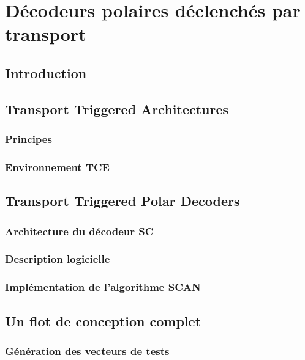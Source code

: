 \chapter{Décodeurs polaires déclenchés par transport} %
\label{chap:tta}

\vspace*{\fill}
\minitocTITI
\vspace*{\fill}
\newpage

\section*{Introduction}

\section{Transport Triggered Architectures}
\subsection{Principes}
\subsection{Environnement TCE}

\section{Transport Triggered Polar Decoders}

\subsection{Architecture du décodeur SC}
\subsection{Description logicielle}
\subsection{Implémentation de l'algorithme SCAN}

\section{Un flot de conception complet}

\subsection{Génération des vecteurs de tests}
